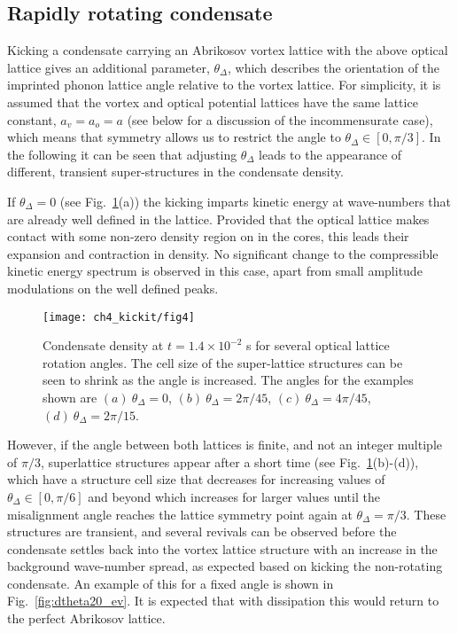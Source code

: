 \subsection{Rapidly rotating condensate}

    Kicking a condensate carrying an Abrikosov vortex lattice with the above optical lattice gives an additional parameter, $\theta_\Delta$, which describes the orientation of the imprinted phonon lattice angle relative to the vortex lattice. For simplicity, it is assumed that the vortex and optical potential lattices have the same lattice constant, $a_v=a_o=a$ (see below for a discussion of the incommensurate case), which means that symmetry allows us to restrict the angle to $\theta_\Delta\in[0,\pi/3]$. In the following it can be seen that adjusting $\theta_\Delta$ leads to the appearance of different, transient super-structures in the condensate density.

    If $\theta_\Delta=0$ (see Fig.~\ref{fig:moire_density}(a)) the kicking imparts kinetic energy at wave-numbers that are already well defined in the lattice. Provided that the optical lattice makes contact with some non-zero density region on in the cores, this leads their expansion and contraction in density. No significant change to the compressible kinetic energy spectrum is observed in this case, apart from small amplitude modulations on the well defined peaks.

	\begin{figure}[tb]
        \centering
			\texttt{[image: ch4\_kickit/fig4]}
			\caption{Condensate density at $t=1.4\times10^{-2}$ s for several optical lattice rotation angles. The cell size of the super-lattice structures can be seen to shrink as the angle is increased. The angles for the examples shown are $(a)~\theta_\Delta=0$, $(b)~\theta_\Delta=2\pi/45$, $(c)~\theta_\Delta=4\pi/45$, $(d)~\theta_\Delta=2\pi/15$. }
			\label{fig:moire_density}
		\end{figure}

    However, if the angle between both lattices is finite, and not an integer multiple of $\pi/3$, superlattice structures appear after a short time (see Fig.~\ref{fig:moire_density}(b)-(d)), which have a structure cell size that decreases for increasing values of $\theta_\Delta\in[0,\pi/6]$ and beyond which increases for larger values until the misalignment angle reaches the lattice symmetry point again at $\theta_\Delta=\pi/3$. These structures are transient, and several revivals can be observed before the condensate settles back into the vortex lattice structure with an increase in the background wave-number spread, as expected based on kicking the non-rotating condensate. An example of this for a fixed angle is shown in Fig.~\ref{fig:dtheta20_ev}. It is expected that with dissipation this would return to the perfect Abrikosov lattice.

